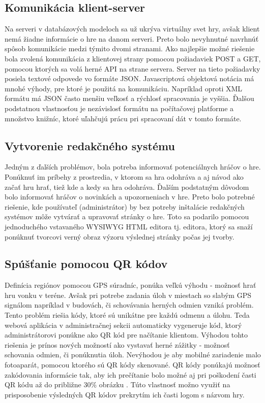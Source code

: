 \subsection{Komunikácia klient-server}
Na serveri v databázových modeloch sa už ukrýva virtuálny svet hry, avšak klient nemá žiadne informácie o hre na danom serveri. Preto bolo nevyhnutné navrhnúť spôsob komunikácie medzi týmito dvomi stranami. Ako najlepšie možné riešenie bola zvolená komunikácia z klientovej strany pomocou požiadaviek POST a GET, pomocou ktorých sa volá herné API na strane servera. Server na tieto požiadavky posiela textové odpovede vo formáte JSON. Javascriptová objektová notácia má mnohé výhody, pre ktoré je použitá na komunikáciu. Napríklad oproti XML formátu má JSON často menšiu veľkosť a rýchlosť spracovania je vyššia. \cite{jsonVsXml} Ďalšou podstatnou vlastnosťou je nezávislosť formátu na počítačovej platforme a množstvo knižníc, ktoré uľahčujú prácu pri spracovaní dát v tomto formáte.

\subsection{Vytvorenie redakčného systému}
Jedným z ďalších problémov, bola potreba informovať potenciálnych hráčov o hre. Ponúknuť im príbehy z prostredia, v ktorom sa hra odohráva a aj návod ako začať hru hrať, tiež kde a kedy sa hra odohráva. Ďalším podstatným dôvodom bolo informovať hráčov o novinkách a upozorneniach v hre. Preto bolo potrebné riešenie, kde používateľ (administrátor) by bez potreby inštalácie redakčných systémov môže vytvárať a upravovať stránky o hre. Toto sa podarilo pomocou jednoduchého vstavaného WYSIWYG HTML editora  tj. editora, ktorý sa snaží ponúknuť tvorcovi verný obraz výzoru výslednej stránky počas jej tvorby.

\subsection{Spúšťanie pomocou QR kódov}

Definícia regiónov pomocou GPS súradníc, ponúka veľkú výhodu - možnosť hrať hru vonku v teréne. Avšak pri potrebe zadania úloh v miestach so slabým GPS signálom napríklad v budovách, či schovávania herných odmien vzniká problém. Tento problém riešia kódy, ktoré sú unikátne pre každú odmenu a úlohu. Teda webová aplikácia v administračnej sekcii automaticky vygeneruje kód, ktorý administrátorovi ponúkne ako QR kód pre načítanie klientom. Výhodou tohto riešenia je prínos nových možností ako vystavať herné zážitky - možnosť schovania odmien, či ponúknutia úloh. Nevýhodou je aby mobilné zariadenie malo fotoaparát, pomocou ktorého sú QR kódy skenované. QR kódy ponúkajú možnosť zakódovania informácie tak, aby ich prečítanie bolo možné aj pri poškodení časti QR kódu až do približne 30\% obrázku \cite{qr-error}. Túto vlastnosť možno využiť na prisposobenie výsledných QR kódov prekrytím ich časti logom s názvom hry.

